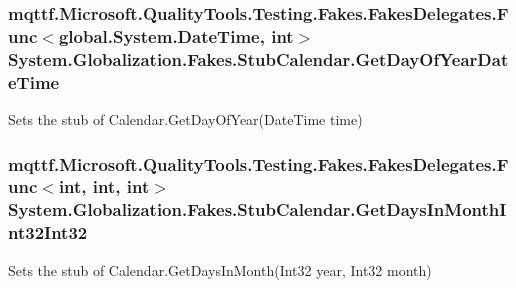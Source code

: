 \hypertarget{class_system_1_1_globalization_1_1_fakes_1_1_stub_calendar_a02d0ac9509112e868805d9a8b21decbd}{
\subsubsection[{Get\-Day\-Of\-Year\-Date\-Time}]{\setlength{\rightskip}{0pt plus 5cm}mqttf.\-Microsoft.\-Quality\-Tools.\-Testing.\-Fakes.\-Fakes\-Delegates.\-Func$<$global.\-System.\-Date\-Time, int$>$ System.\-Globalization.\-Fakes.\-Stub\-Calendar.\-Get\-Day\-Of\-Year\-Date\-Time}}\label{class_system_1_1_globalization_1_1_fakes_1_1_stub_calendar_a02d0ac9509112e868805d9a8b21decbd}


Sets the stub of Calendar.\-Get\-Day\-Of\-Year(\-Date\-Time time)

\hypertarget{class_system_1_1_globalization_1_1_fakes_1_1_stub_calendar_ac856660bdc078b6b34fd4c54305a34a8}{
\subsubsection[{Get\-Days\-In\-Month\-Int32\-Int32}]{\setlength{\rightskip}{0pt plus 5cm}mqttf.\-Microsoft.\-Quality\-Tools.\-Testing.\-Fakes.\-Fakes\-Delegates.\-Func$<$int, int, int$>$ System.\-Globalization.\-Fakes.\-Stub\-Calendar.\-Get\-Days\-In\-Month\-Int32\-Int32}}\label{class_system_1_1_globalization_1_1_fakes_1_1_stub_calendar_ac856660bdc078b6b34fd4c54305a34a8}


Sets the stub of Calendar.\-Get\-Days\-In\-Month(\-Int32 year, Int32 month)


